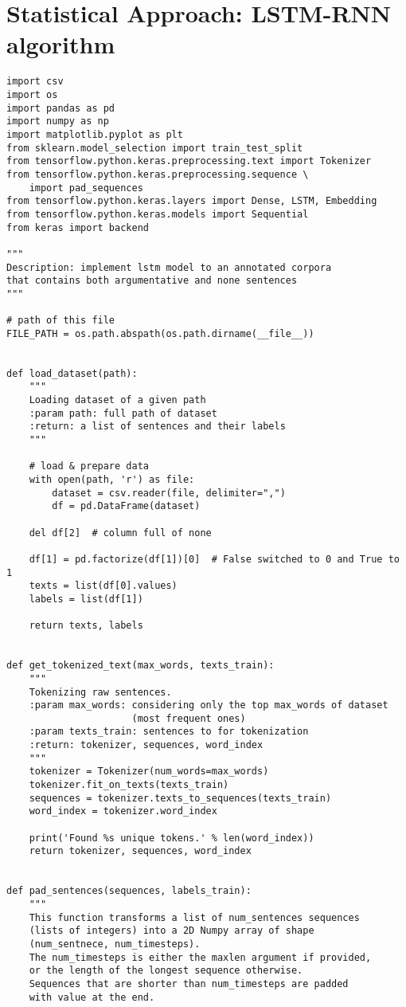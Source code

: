 
\chapter{Statistical Approach: LSTM-RNN algorithm}

\label{Appendix10}

\begin{lstlisting}[language=iPython]
import csv
import os
import pandas as pd
import numpy as np
import matplotlib.pyplot as plt
from sklearn.model_selection import train_test_split
from tensorflow.python.keras.preprocessing.text import Tokenizer
from tensorflow.python.keras.preprocessing.sequence \
	import pad_sequences
from tensorflow.python.keras.layers import Dense, LSTM, Embedding
from tensorflow.python.keras.models import Sequential
from keras import backend

"""
Description: implement lstm model to an annotated corpora
that contains both argumentative and none sentences
"""

# path of this file
FILE_PATH = os.path.abspath(os.path.dirname(__file__))


def load_dataset(path):
	"""
	Loading dataset of a given path
	:param path: full path of dataset
	:return: a list of sentences and their labels
	"""
	
	# load & prepare data
	with open(path, 'r') as file:
		dataset = csv.reader(file, delimiter=",")
		df = pd.DataFrame(dataset)
	
	del df[2]  # column full of none
	
	df[1] = pd.factorize(df[1])[0]  # False switched to 0 and True to 1
	texts = list(df[0].values)
	labels = list(df[1])
	
	return texts, labels


def get_tokenized_text(max_words, texts_train):
	"""
	Tokenizing raw sentences.
	:param max_words: considering only the top max_words of dataset 
					  (most frequent ones)
	:param texts_train: sentences to for tokenization
	:return: tokenizer, sequences, word_index
	"""
	tokenizer = Tokenizer(num_words=max_words)
	tokenizer.fit_on_texts(texts_train)
	sequences = tokenizer.texts_to_sequences(texts_train)
	word_index = tokenizer.word_index
	
	print('Found %s unique tokens.' % len(word_index))
	return tokenizer, sequences, word_index


def pad_sentences(sequences, labels_train):
	"""
	This function transforms a list of num_sentences sequences
	(lists of integers) into a 2D Numpy array of shape 
	(num_sentnece, num_timesteps).
	The num_timesteps is either the maxlen argument if provided,
	or the length of the longest sequence otherwise.
	Sequences that are shorter than num_timesteps are padded 
	with value at the end.
	

\end{lstlisting}
